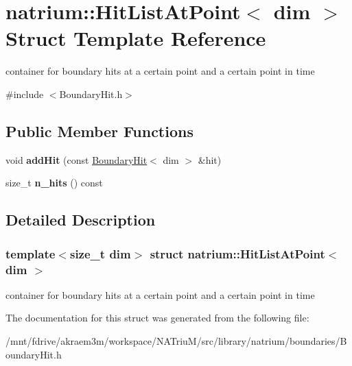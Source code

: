 \hypertarget{structnatrium_1_1HitListAtPoint}{
\section{natrium::HitListAtPoint$<$ dim $>$ Struct Template Reference}
\label{structnatrium_1_1HitListAtPoint}
}


container for boundary hits at a certain point and a certain point in time  


{\ttfamily \#include $<$BoundaryHit.h$>$}\subsection*{Public Member Functions}
\begin{DoxyCompactItemize}
\item 
\hypertarget{structnatrium_1_1HitListAtPoint_a433f6ac4be1a53d1fb4b0f045fc87aa1}{
void {\bfseries addHit} (const \hyperlink{structnatrium_1_1BoundaryHit}{BoundaryHit}$<$ dim $>$ \&hit)}
\label{structnatrium_1_1HitListAtPoint_a433f6ac4be1a53d1fb4b0f045fc87aa1}

\item 
\hypertarget{structnatrium_1_1HitListAtPoint_a7d9263b4896c061d9efc0b1d2c62a538}{
size\_\-t {\bfseries n\_\-hits} () const }
\label{structnatrium_1_1HitListAtPoint_a7d9263b4896c061d9efc0b1d2c62a538}

\end{DoxyCompactItemize}


\subsection{Detailed Description}
\subsubsection*{template$<$size\_\-t dim$>$ struct natrium::HitListAtPoint$<$ dim $>$}

container for boundary hits at a certain point and a certain point in time 

The documentation for this struct was generated from the following file:\begin{DoxyCompactItemize}
\item 
/mnt/fdrive/akraem3m/workspace/NATriuM/src/library/natrium/boundaries/BoundaryHit.h\end{DoxyCompactItemize}
